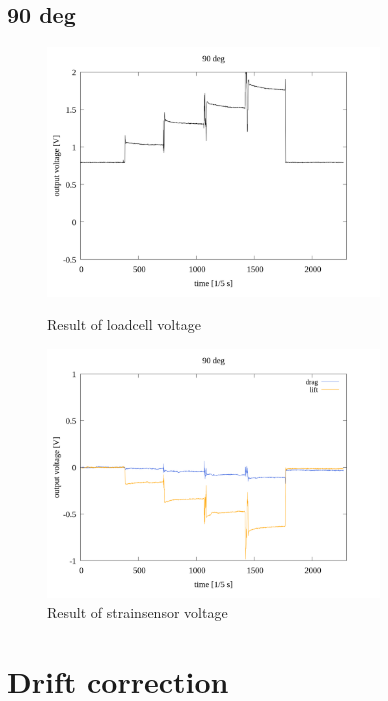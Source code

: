 \documentclass[twocolumn,a4j]{jsarticle}
\begin{document}
\subsection{90 deg}
\begin{figure}[htbp]
    \footnotesize
    \begin{center}
        \includegraphics[width=88mm]{../images/voltage-time/90_loadcell.png}
        \caption{Result of loadcell voltage}
        \includegraphics[width=88mm]{../images/voltage-time/90_strainsensor.png}
        \caption{Result of strainsensor voltage}
    \end{center}
\end{figure}

\newpage
\section{Drift correction}
\end{document}
